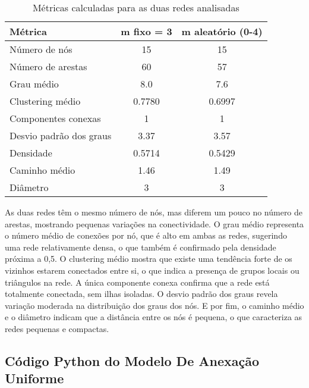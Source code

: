 \documentclass[a4paper]{article}
\begin{document}
\begin{table}[h]
\centering
\begin{tabular}{|l|c|c|}
\hline
\textbf{Métrica} & \textbf{m fixo = 3} & \textbf{m aleatório (0-4)} \\
\hline
Número de nós & 15 & 15 \\
Número de arestas & 60 & 57 \\
Grau médio & 8.0 & 7.6 \\
Clustering médio & 0.7780 & 0.6997 \\
Componentes conexas & 1 & 1 \\
Desvio padrão dos graus & 3.37 & 3.57 \\
Densidade & 0.5714 & 0.5429 \\
Caminho médio & 1.46 & 1.49 \\
Diâmetro & 3 & 3 \\
\hline
\end{tabular}
\caption{Métricas calculadas para as duas redes analisadas}
\label{tab:metricas_rede_pequenas}
\end{table}

As duas redes têm o mesmo número de nós, mas diferem um pouco no número de arestas, mostrando pequenas variações na conectividade. O grau médio representa o número médio de conexões por nó, que é alto em ambas as redes, sugerindo uma rede relativamente densa, o que também é confirmado pela densidade próxima a 0,5. O clustering médio mostra que existe uma tendência forte de os vizinhos estarem conectados entre si, o que indica a presença de grupos locais ou triângulos na rede. A única componente conexa confirma que a rede está totalmente conectada, sem ilhas isoladas. O desvio padrão dos graus revela variação moderada na distribuição dos graus dos nós. E por fim, o caminho médio e o diâmetro indicam que a distância entre os nós é pequena, o que caracteriza as redes pequenas e compactas.

\newpage

\subsection{Código Python do Modelo De Anexação Uniforme}
\end{document}
